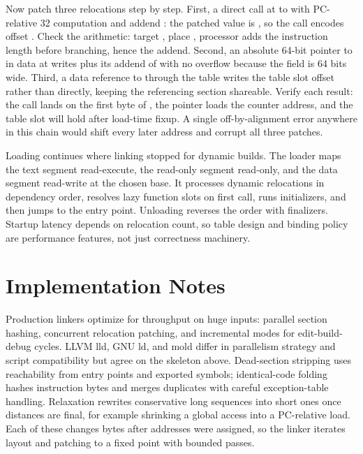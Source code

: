 Now patch three relocations step by step.
First, a direct call at  to  with PC-relative 32 computation and addend : the patched value is , so the call encodes offset .
Check the arithmetic: target , place , processor adds the instruction length before branching, hence the  addend.
Second, an absolute 64-bit pointer to  in data at  writes  plus its addend of  with no overflow because the field is 64 bits wide.
Third, a data reference to  through the table writes the table slot offset rather than  directly, keeping the referencing section shareable.
Verify each result: the call lands on the first byte of , the pointer loads the counter address, and the table slot will hold  after load-time fixup.
A single off-by-alignment error anywhere in this chain would shift every later address and corrupt all three patches.

Loading continues where linking stopped for dynamic builds.
The loader maps the text segment read-execute, the read-only segment read-only, and the data segment read-write at the chosen base.
It processes dynamic relocations in dependency order, resolves lazy function slots on first call, runs initializers, and then jumps to the entry point.
Unloading reverses the order with finalizers.
Startup latency depends on relocation count, so table design and binding policy are performance features, not just correctness machinery.

\section{Implementation Notes}\label{sec:ch29-implementation}

Production linkers optimize for throughput on huge inputs: parallel section hashing, concurrent relocation patching, and incremental modes for edit-build-debug cycles.
LLVM lld, GNU ld, and mold differ in parallelism strategy and script compatibility but agree on the skeleton above.
Dead-section stripping uses reachability from entry points and exported symbols; identical-code folding hashes instruction bytes and merges duplicates with careful exception-table handling.
Relaxation rewrites conservative long sequences into short ones once distances are final, for example shrinking a global access into a PC-relative load.
Each of these changes bytes after addresses were assigned, so the linker iterates layout and patching to a fixed point with bounded passes.

